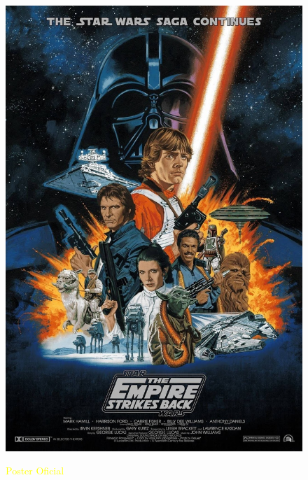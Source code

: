 \documentclass[11pt, a5paper]{article}
\begin{document}
\begin{figure}[h]
    \Raggedleft
    \caption*{\textcolor{yellow}{Poster Oficial}}
    \includegraphics[scale=0.07, angle=15]{Star wars representativa.jpg}
    \label{fig:my_label}
\end{figure}
\end{document}

